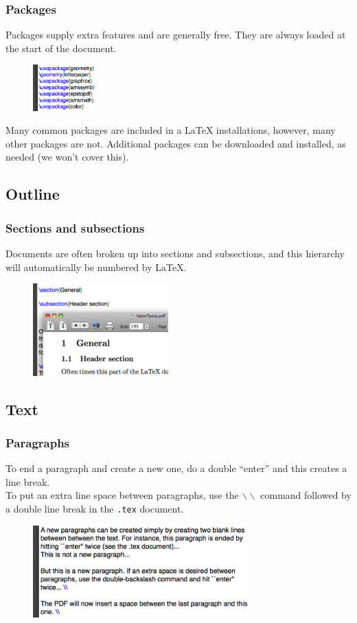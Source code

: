 \documentclass[slidestop,compress,mathserif]{beamer}
\begin{document}
\begin{frame} \frametitle{Packages}
Packages supply extra features and are generally free. They are always loaded at the start of the document. \\
\begin{figure}[htbp]
   \centering
   \includegraphics[height=0.7in]{basicsOfLatex/general/packages}
\end{figure}
Many common packages are included in a LaTeX installations, however, many other packages are not. Additional packages can be downloaded and installed, as needed (we won't cover this).
\end{frame}

\subsection[Outline]{Outline}
\begin{frame} \frametitle{Sections and subsections}
Documents are often broken up into sections and subsections, and this hierarchy will automatically be numbered by LaTeX.
\begin{figure}[htbp]
   \centering
   \includegraphics[height=1.4in]{basicsOfLatex/general/sectionsSubsections}
\end{figure}
\end{frame}

\subsection[Text]{Text}
\begin{frame} \frametitle{Paragraphs}
To end a paragraph and create a new one, do a double ``{\color{highlight}enter}'' and this creates a line break. \\
\vspace{0.5cm}
To put an extra line space between paragraphs, use the \texttt{\color{command}$\backslash\backslash$} command followed by a double line break in the \texttt{.tex} document.
\begin{figure}[htbp]
   \centering
   \includegraphics[height=1.4in]{basicsOfLatex/general/paragraphSpacing}
\end{figure}
\end{frame}
\end{document}
